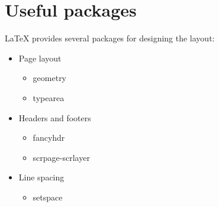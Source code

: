 \documentclass{article}
\begin{document}
\section*{Useful packages}
LaTeX provides several packages for designing the layout:

\begin{itemize}
    \item Page layout
          \begin{itemize}
              \item geometry
              \item typearea
          \end{itemize}
    \item Headers and footers
          \begin{itemize}
              \item fancyhdr
              \item scrpage-scrlayer
          \end{itemize}
    \item Line spacing
          \begin{itemize}
              \item setspace
          \end{itemize}
\end{itemize}
\end{document}
